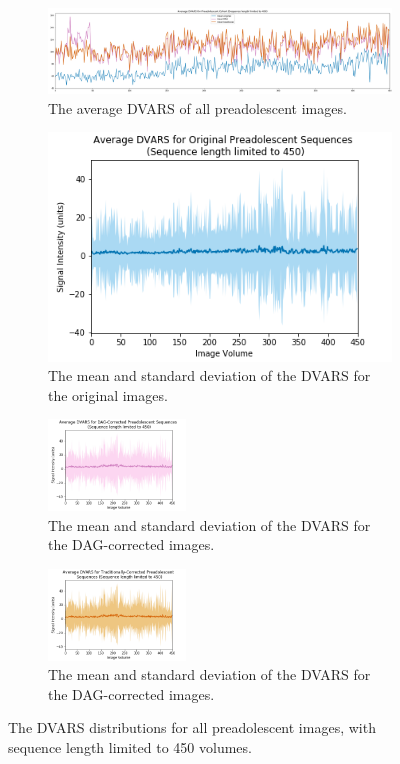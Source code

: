 \begin{figure}[t]
	\centering
	\begin{subfigure}{0.9\textwidth}
		\centering
		\includegraphics[width=1.0\textwidth]{6/figures/pread_dvars_all_450_avg.png}
		\caption{The average DVARS of all preadolescent images.}
	\end{subfigure}

	\begin{subfigure}{0.9\textwidth}
		\centering
		\includegraphics[width=.4\textwidth]{6/figures/pread-bold-dvars-450.png}
		\caption{The mean and standard deviation of the DVARS for the original images.}
	\end{subfigure}
	
	\begin{subfigure}{0.9\textwidth}
		\centering
		\includegraphics[width=0.4\textwidth]{6/figures/pread-dag-dvars-450.png}
		\caption{The mean and standard deviation of the DVARS for the DAG-corrected images.}
	\end{subfigure}
	
	\begin{subfigure}{0.9\textwidth}
		\centering
		\includegraphics[width=0.4\textwidth]{6/figures/pread-trad-dvars-450.png}
		\caption{The mean and standard deviation of the DVARS for the DAG-corrected images.}
	\end{subfigure}
\caption{The DVARS distributions for all preadolescent images, with sequence length limited to 450 volumes.}
\label{fig:pread-dvars-450}
\end{figure}

